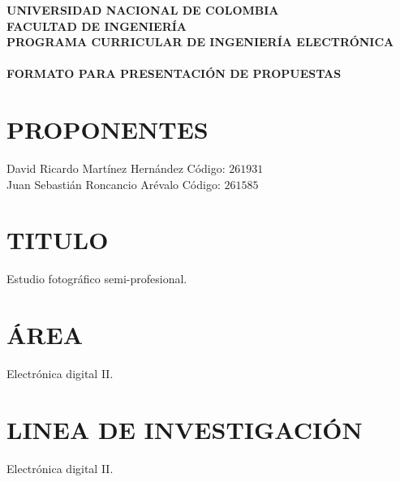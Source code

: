 \documentclass[10pt,graphicx,caption,rotating]{article}
\begin{document}
\date{}
{\centering \textbf{ \Large {UNIVERSIDAD NACIONAL DE COLOMBIA \\
FACULTAD DE INGENIERÍA\[\]}}}
\textbf{ \Large {PROGRAMA CURRICULAR DE INGENIERÍA ELECTRÓNICA}} \\ \\
\textbf{ \Large {FORMATO PARA PRESENTACIÓN DE PROPUESTAS}}

\section{PROPONENTES}
\noindent
David Ricardo Martínez Hernández \hspace{0.78cm} Código: $261931$\\
Juan Sebastián Roncancio Arévalo \hspace{0.95cm} Código: $261585$

\section{TITULO}
\noindent
Estudio fotográfico semi-profesional.

\section{ÁREA}
\noindent
Electrónica digital II.

\section{LINEA DE INVESTIGACIÓN}
\noindent
Electrónica digital II.
\end{document}
